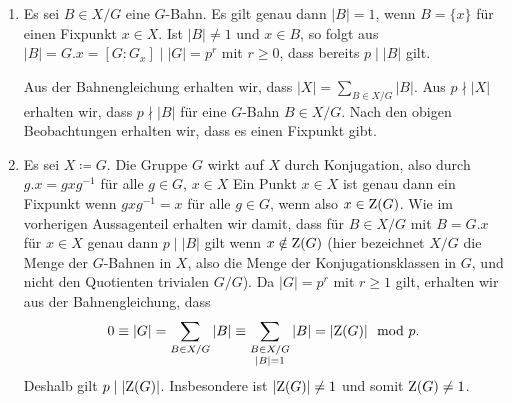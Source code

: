 \begin{solution}
  \begin{enumerate}
    \item
      Es sei $B \in X/G$ eine $G$-Bahn.
      Es gilt genau dann $|B| = 1$, wenn $B = \{x\}$ für einen Fixpunkt $x \in X$.
      Ist $|B| \neq 1$ und $x \in B$, so folgt aus $|B| = G.x = [G : G_x] \mid |G| = p^r$ mit $r \geq 0$, dass bereits $p \mid |B|$ gilt.
      
      Aus der Bahnengleichung erhalten wir, dass $|X| = \sum_{B \in X/G} |B|$.
      Aus $p \nmid |X|$ erhalten wir, dass $p \nmid |B|$ für eine $G$-Bahn $B \in X/G$.
      Nach den obigen Beobachtungen erhalten wir, dass es einen Fixpunkt gibt.
    
    \item
      Es sei $X \coloneqq G$.
      Die Gruppe $G$ wirkt auf $X$ durch Konjugation, also durch $g.x = g x g^{-1}$ für alle $g \in G$, $x \in X$
      Ein Punkt $x \in X$ ist genau dann ein Fixpunkt wenn $g x g^{-1} = x$ für alle $g \in G$, wenn also $x \in \operatorname{Z}(G)$.
      Wie im vorherigen Aussagenteil erhalten wir damit, dass für $B \in X/G$ mit $B = G.x$ für $x \in X$ genau dann $p \mid |B|$ gilt wenn $x \notin \operatorname{Z}(G)$ (hier bezeichnet $X/G$ die Menge der $G$-Bahnen in $X$, also die Menge der Konjugationsklassen in $G$, und nicht den Quotienten trivialen $G/G$).
      Da $|G| = p^r$ mit $r \geq 1$ gilt, erhalten wir aus der Bahnengleichung, dass
      \[
                0
        \equiv  |G|
        =       \sum_{B \in X/G} |B|
        \equiv  \sum_{\substack{B \in X/G \\ |B| = 1}} |B|
        =       |{\operatorname{Z}(G)}|
        \mod    p.
      \]
      Deshalb gilt $p \mid |{\operatorname{Z}(G)}|$.
      Insbesondere ist $|{\operatorname{Z}(G)}| \neq 1$ und somit $\operatorname{Z}(G) \neq 1$.
 \end{enumerate} 
\end{solution}


